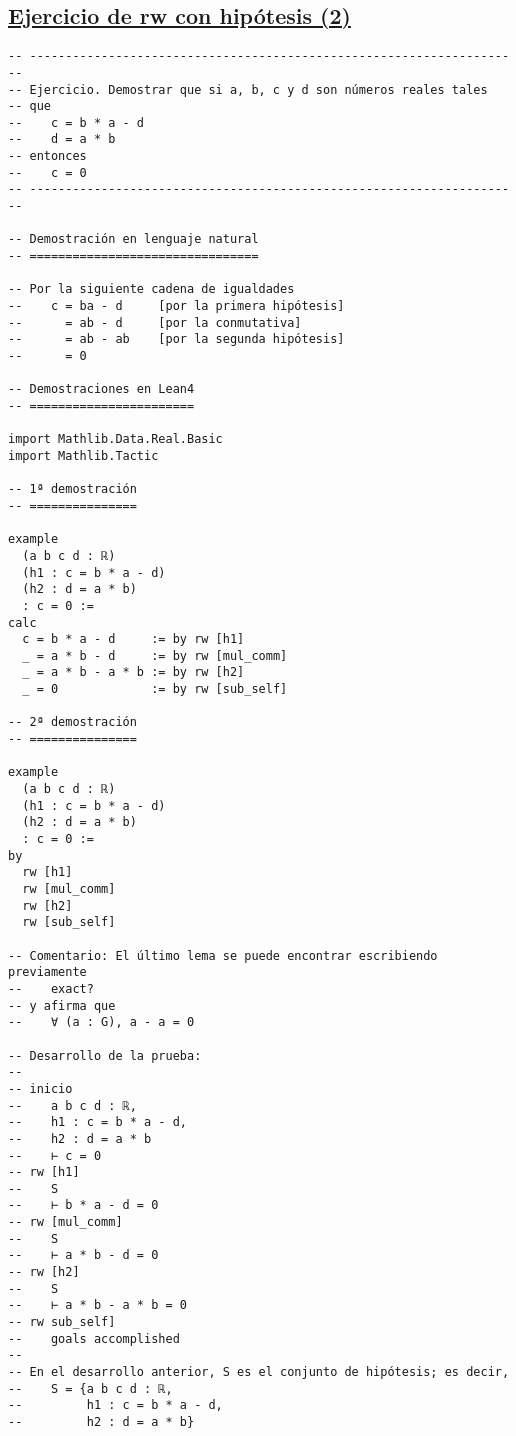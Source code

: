 \subsection{\href{./src/Basicos/Ejercicio\_de\_rw\_sobre\_hipotesis\_2.lean}{Ejercicio de rw con hipótesis (2)}}
\label{sec:org7306244}
\begin{verbatim}
-- ---------------------------------------------------------------------
-- Ejercicio. Demostrar que si a, b, c y d son números reales tales
-- que
--    c = b * a - d
--    d = a * b
-- entonces
--    c = 0
-- ---------------------------------------------------------------------

-- Demostración en lenguaje natural
-- ================================

-- Por la siguiente cadena de igualdades
--    c = ba - d     [por la primera hipótesis]
--      = ab - d     [por la conmutativa]
--      = ab - ab    [por la segunda hipótesis]
--      = 0

-- Demostraciones en Lean4
-- =======================

import Mathlib.Data.Real.Basic
import Mathlib.Tactic

-- 1ª demostración
-- ===============

example
  (a b c d : ℝ)
  (h1 : c = b * a - d)
  (h2 : d = a * b)
  : c = 0 :=
calc
  c = b * a - d     := by rw [h1]
  _ = a * b - d     := by rw [mul_comm]
  _ = a * b - a * b := by rw [h2]
  _ = 0             := by rw [sub_self]

-- 2ª demostración
-- ===============

example
  (a b c d : ℝ)
  (h1 : c = b * a - d)
  (h2 : d = a * b)
  : c = 0 :=
by
  rw [h1]
  rw [mul_comm]
  rw [h2]
  rw [sub_self]

-- Comentario: El último lema se puede encontrar escribiendo previamente
--    exact?
-- y afirma que
--    ∀ (a : G), a - a = 0

-- Desarrollo de la prueba:
--
-- inicio
--    a b c d : ℝ,
--    h1 : c = b * a - d,
--    h2 : d = a * b
--    ⊢ c = 0
-- rw [h1]
--    S
--    ⊢ b * a - d = 0
-- rw [mul_comm]
--    S
--    ⊢ a * b - d = 0
-- rw [h2]
--    S
--    ⊢ a * b - a * b = 0
-- rw sub_self]
--    goals accomplished
--
-- En el desarrollo anterior, S es el conjunto de hipótesis; es decir,
--    S = {a b c d : ℝ,
--         h1 : c = b * a - d,
--         h2 : d = a * b}
\end{verbatim}

